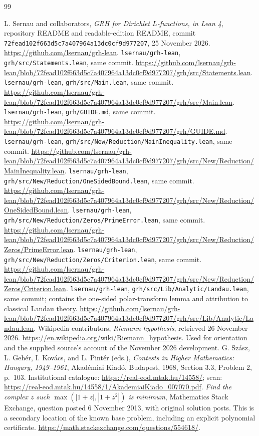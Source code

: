 \documentclass[11pt,a4paper]{article}
\theoremstyle{definition}\newtheorem{definition}[theorem]{Definition}
\theoremstyle{remark}\newtheorem{remark}[theorem]{Remark}
\newcommand{\repo}{\texttt{lsernau/grh-lean}}
\newcommand{\sha}{\nolinkurl{72fead102f663d5c7a407964a13dc0cf9d977207}}
\begin{document}
\clearpage
\begin{thebibliography}{99}
\small\raggedright
{} L. Sernau and collaborators, \emph{GRH for Dirichlet $L$-functions, in Lean 4}, repository README and readable-edition README, commit \sha, 25 November 2026. \url{https://github.com/lsernau/grh-lean}.
 \repo, \texttt{grh/src/Statements.lean}, same commit. \url{https://github.com/lsernau/grh-lean/blob/72fead102f663d5c7a407964a13dc0cf9d977207/grh/src/Statements.lean}.
 \repo, \texttt{grh/src/Main.lean}, same commit. \url{https://github.com/lsernau/grh-lean/blob/72fead102f663d5c7a407964a13dc0cf9d977207/grh/src/Main.lean}.
 \repo, \texttt{grh/GUIDE.md}, same commit. \url{https://github.com/lsernau/grh-lean/blob/72fead102f663d5c7a407964a13dc0cf9d977207/grh/GUIDE.md}.
 \repo, \texttt{grh/src/New/Reduction/MainInequality.lean}, same commit. \url{https://github.com/lsernau/grh-lean/blob/72fead102f663d5c7a407964a13dc0cf9d977207/grh/src/New/Reduction/MainInequality.lean}.
 \repo, \texttt{grh/src/New/Reduction/OneSidedBound.lean}, same commit. \url{https://github.com/lsernau/grh-lean/blob/72fead102f663d5c7a407964a13dc0cf9d977207/grh/src/New/Reduction/OneSidedBound.lean}.
 \repo, \texttt{grh/src/New/Reduction/Zeros/PrimeError.lean}, same commit. \url{https://github.com/lsernau/grh-lean/blob/72fead102f663d5c7a407964a13dc0cf9d977207/grh/src/New/Reduction/Zeros/PrimeError.lean}.
 \repo, \texttt{grh/src/New/Reduction/Zeros/Criterion.lean}, same commit. \url{https://github.com/lsernau/grh-lean/blob/72fead102f663d5c7a407964a13dc0cf9d977207/grh/src/New/Reduction/Zeros/Criterion.lean}.
 \repo, \texttt{grh/src/Lib/Analytic/Landau.lean}, same commit; contains the one-sided polar-transform lemma and attribution to classical Landau theory. \url{https://github.com/lsernau/grh-lean/blob/72fead102f663d5c7a407964a13dc0cf9d977207/grh/src/Lib/Analytic/Landau.lean}.
 Wikipedia contributors, \emph{Riemann hypothesis}, retrieved 26 November 2026. \url{https://en.wikipedia.org/wiki/Riemann_hypothesis}. Used for orientation and the supplied source's account of the November 2026 development.
 G. Sz\'asz, L. Geh\'er, I. Kov\'acs, and L. Pint\'er (eds.), \emph{Contests in Higher Mathematics: Hungary, 1949--1961}, Akad\'emiai Kiad\'o, Budapest, 1968, Section 3.3, Problem 2, p.~103. Institutional catalogue: \url{https://real-eod.mtak.hu/14558/}; scan: \url{https://real-eod.mtak.hu/14558/1/AkademiaiKiado_007070.pdf}.
 \emph{Find the complex $z$ such $\max(|1+z|,|1+z^2|)$ is minimum}, Mathematics Stack Exchange, question posted 6 November 2013, with original solution posts. This is a secondary location of the known base problem, including an explicit polynomial certificate. \url{https://math.stackexchange.com/questions/554618/}.
\end{thebibliography}
\end{document}
